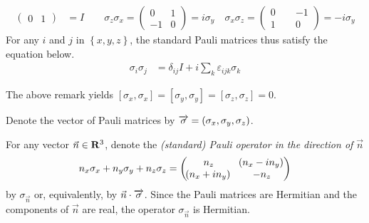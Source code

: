 \begin{remark}
\begin{align*}
\begin{pmatrix}
			0 & 1
		\end{pmatrix}
		 & = I \qquad
		\sigma_z \sigma_x =
		\begin{pmatrix}
			0  & 1 \\
			-1 & 0
		\end{pmatrix}
		= i \sigma_y \quad
		\sigma_x \sigma_z =
		\begin{pmatrix}
			0 \phantom{+} & -1 \\
			1 \phantom{+} & 0
		\end{pmatrix}
		= - i \sigma_y
	\end{align*}
	For any $i$ and $j$ in $\left\{x,y,z\right\}$, the standard Pauli matrices thus satisfy the equation below.
	\begin{align*}
		\sigma_i \sigma_j & = \delta_{ij} I + i \sum_k \varepsilon_{ijk} \sigma_k
	\end{align*}
\end{remark}

The above remark yields $[\sigma_x, \sigma_x] = [\sigma_y, \sigma_y] = [\sigma_z, \sigma_z] = 0$.

Denote the vector of Pauli matrices by $\overrightarrow{\sigma} = \left(\sigma_x, \sigma_y, \sigma_z\right)$.

For any vector $\vec{n} \in \mathbf{R}^3$, denote the \emph{(standard) Pauli operator in the direction of $\vec{n}$}
\begin{equation}\label{eqn:Pauli}
	n_x \sigma_x + n_y \sigma_y + n_z \sigma_z
	=
	\begin{pmatrix}
		n_z             & \!\left(n_x - i n_y\right) \\
		\!\left(n_x + i n_y\right) & - n_z
	\end{pmatrix}
\end{equation}
by $\sigma_{\vec{n}}$ or, equivalently, by $\vec{n} \cdot \overrightarrow{\sigma}$.
Since the Pauli matrices are Hermitian and the components of $\vec{n}$ are real, the operator $\sigma_{\vec{n}}$ is Hermitian.

